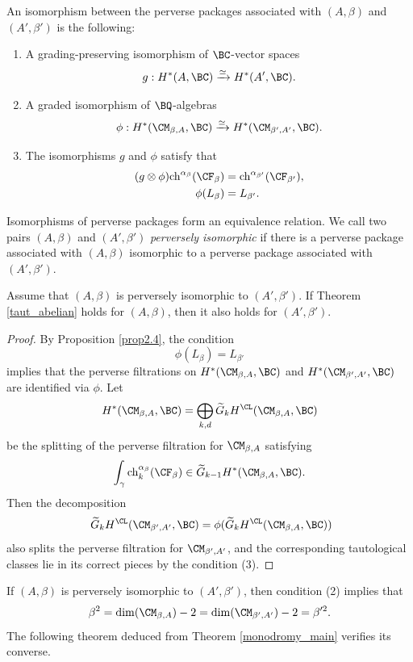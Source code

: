 An isomorphism between the perverse packages associated with $(A, \beta)$ and $(A', \beta')$ is the following:
\begin{enumerate}
    \item[(1)] A grading-preserving isomorphism of $\BC$-vector spaces
    \[
    g: H^*(A, \BC) \xrightarrow{\simeq} H^*(A', \BC).
    \]
    \item[(2)] A graded isomorphism of $\BQ$-algebras
    \[
    \phi: H^*(\CM_{\beta,A}, \BC) \xrightarrow{\simeq} H^*(\CM_{\beta',A'}, \BC).
    \]
    \item[(3)] The isomorphisms $g$ and $\phi$ satisfy that
    \[
    \begin{split}
        (g\otimes \phi) \mathrm{ch}^{\alpha_\beta} (\CF_\beta) & = \mathrm{ch}^{\alpha_{\beta'}}(\CF_{\beta'}),\\
        \phi(L_\beta) & = L_{\beta'}.
    \end{split}
    \]
\end{enumerate}
Isomorphisms of perverse packages form an equivalence relation. We call two pairs $(A, \beta)$ and $(A', \beta')$ \emph{perversely isomorphic} if there is a perverse package associated with $(A,\beta)$ isomorphic to a perverse package associated with $(A', \beta')$.

\begin{prop}
\notready\label{prop2.5}
Assume that $(A, \beta)$ is perversely isomorphic to $(A', \beta')$. If Theorem \ref{taut_abelian} holds for $(A, \beta)$, then it also holds for $(A', \beta')$.
\end{prop}

\begin{proof}
By Proposition \ref{prop2.4}, the condition
\[
\phi(L_\beta) = L_{\beta'}
\]
implies that the perverse filtrations on $H^*(\CM_{\beta,A}, \BC)$ and $H^*(\CM_{\beta', A'}, \BC)$ are identified via $\phi$. Let
\[
H^*(\CM_{\beta,A}, \BC) = \bigoplus_{k,d} \widetilde{G}_k H^\CL(\CM_{\beta,A}, \BC)
\]
be the splitting of the perverse filtration for $\CM_{\beta, A}$ satisfying
\[
\int_\gamma \mathrm{ch}^{\alpha_\beta}_k(\CF_\beta) \in \widetilde{G}_{k-1}H^*(\CM_{\beta,A}, \BC).
\]
Then the decomposition
\[
\
\widetilde{G}_k H^\CL(\CM_{\beta',A'}, \BC) = \phi(\widetilde{G}_k H^\CL(\CM_{\beta,A}, \BC))
\]
also splits the perverse filtration for $\CM_{\beta',A'}$, and the corresponding tautological classes lie in its correct pieces by the condition (3).
\end{proof}

If $(A, \beta)$ is perversely isomorphic to $(A', \beta')$, then condition (2) implies that
\[
\beta^2 = \mathrm{dim}(\CM_{\beta,A}) -2 = \mathrm{dim}(\CM_{\beta',A'}) -2 = \beta'^2.
\]
The following theorem deduced from Theorem \ref{monodromy_main} verifies its converse.

